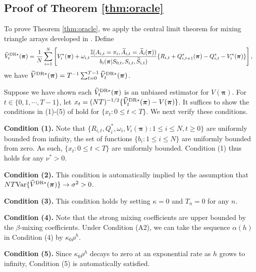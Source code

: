 \documentclass{article}
\newcommand{\Var}{{\mbox{Var}}}
\begin{document}
\subsection{Proof of Theorem \ref{thm:oracle}}
To prove Theorem \ref{thm:oracle}, we apply the central limit theorem for mixing triangle arrays developed in \cite{francq2005central}. Define
\begin{eqnarray*}
	\widehat{V}_t^{\hbox{\scriptsize{DR}}*}(\bm{\pi})=\frac{1}{N}\sum_{i=1}^N \left[V_i^*(\bm{\pi})+ \omega_{i,t}\frac{\mathbb{I}(A_{i,t}=\pi_i,\widetilde{A}_{i,t}=\widetilde{A}_i(\bm{\pi}))}{b_i(\bm{\pi}|S_{0,t},S_{i,t},\widetilde{S}_{i,t})}
	\{R_{i,t}+Q_{i,t+1}^*(\bm{\pi})-Q_{i,t}^*-V_i^*(\bm{\pi})\}\right],
\end{eqnarray*}
we have $\widehat{V}^{\hbox{\scriptsize{DR}}*}(\bm{\pi})=T^{-1} \sum_{t=0}^{T-1} \widehat{V}_t^{\hbox{\scriptsize{DR}}*}(\bm{\pi})$. 

Suppose we have shown each $\widehat{V}_t^{\hbox{\scriptsize{DR}}*}(\bm{\pi})$ is an unbiased estimator for $V(\bm{\pi})$. For $t\in \{0,1,\cdots,T-1\}$, let $x_t=(NT)^{-1/2} \{\widehat{V}_t^{\hbox{\scriptsize{DR}}*}(\bm{\pi})-V(\bm{\pi})\}$. It suffices to show the conditions in (1)-(5) of \cite{francq2005central} hold for $\{x_t:0\le t<T\}$. We next verify these conditions.

\textbf{Condition (1).} Note that $\{R_{i,t}, Q_i^*, \omega_{i}, V_i(\bm{\pi}):1\le i\le N,t\ge 0\}$ are uniformly bounded from infinity, the set of functions $\{b_i:1\le i\le N\}$ are uniformly bounded from zero. As such, $\{x_t:0\le t<T\}$ are uniformly bounded. Condition (1) thus holds for any $\nu^*>0$. 

\textbf{Condition (2).} This condition is automatically implied by the assumption that $ NT \Var\{\widehat{V}^{\hbox{\scriptsize{DR}}*}(\bm{\pi})\}\to \sigma^2>0$. 

\textbf{Condition (3).} This condition holds by setting $\kappa=0$ and $T_n=0$ for any $n$.

\textbf{Condition (4).} Note that the strong mixing coefficients are upper bounded by the $\beta$-mixing coefficients. Under Condition (A2), we can take the sequence $\alpha(h)$ in Condition (4) by $\kappa_0 \rho^h$. 

\textbf{Condition (5).} Since $\kappa_0 \rho^h$ decays to zero at an exponential rate as $h$ grows to infinity, Condition (5) is automatically satisfied. 
\end{document}
